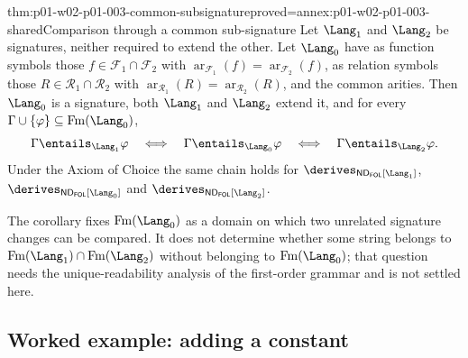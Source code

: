 \begin{hbcorollary}{thm:p01-w02-p01-003-common-subsignature}{proved=annex:p01-w02-p01-003-shared}{Comparison through a common sub-signature}
Let \(\Lang_1\) and \(\Lang_2\) be signatures, neither required to extend
the other. Let \(\Lang_0\) have as function symbols those
\(f\in\mathcal F_1\cap\mathcal F_2\) with
\(\operatorname{ar}_{\mathcal F_1}(f)=\operatorname{ar}_{\mathcal F_2}(f)\),
as relation symbols those \(R\in\mathcal R_1\cap\mathcal R_2\) with
\(\operatorname{ar}_{\mathcal R_1}(R)=\operatorname{ar}_{\mathcal R_2}(R)\),
and the common arities. Then \(\Lang_0\) is a signature, both \(\Lang_1\)
and \(\Lang_2\) extend it, and for every
\(\Gamma\cup\{\varphi\}\subseteq\operatorname{Fm}(\Lang_0)\),
\[
 \Gamma\entails_{\Lang_1}\varphi
 \quad\Longleftrightarrow\quad
 \Gamma\entails_{\Lang_0}\varphi
 \quad\Longleftrightarrow\quad
 \Gamma\entails_{\Lang_2}\varphi .
\]
Under the Axiom of Choice the same chain holds for
\(\derives_{\mathsf{ND}_{\mathsf{FOL}}[\Lang_1]}\),
\(\derives_{\mathsf{ND}_{\mathsf{FOL}}[\Lang_0]}\) and
\(\derives_{\mathsf{ND}_{\mathsf{FOL}}[\Lang_2]}\).
\end{hbcorollary}

The corollary fixes \(\operatorname{Fm}(\Lang_0)\) as a domain on which two
unrelated signature changes can be compared. It does not determine whether
some string belongs to \(\operatorname{Fm}(\Lang_1)\cap\operatorname{Fm}(\Lang_2)\)
without belonging to \(\operatorname{Fm}(\Lang_0)\); that question needs the
unique-readability analysis of the first-order grammar and is not settled
here.

\subsection{Worked example: adding a constant}
\label{sec:p01-w02-p01-003-example}

